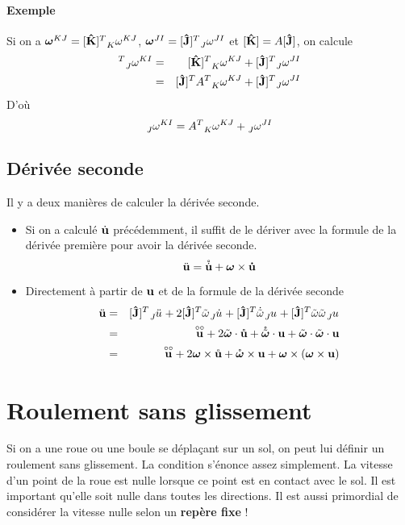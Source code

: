 \paragraph{Exemple}
Si on a $\omegaf^{KJ} = [\uk]^T \wtr{K}{\omega}{KJ}$, $\omegaf^{JI} = [\uj]^T \wtr{J}{\omega}{JI}$ et $[{\bf\hat{K}}] = A[{\bf\hat{J}}]$, on calcule
\begin{eqnarray*}
	[\uj]^T \wtr{J}{\omega}{KI} &=& [\uk]^T \wtr{K}{\omega}{KJ} + [\uj]^T \wtr{J}{\omega}{JI}\\
	&=& [\uj]^T A^T \wtr{K}{\omega}{KJ} + [\uj]^T \wtr{J}{\omega}{JI}
\end{eqnarray*}
D'où
\[ \wtr{J}{\omega}{KI} = A^T \wtr{K}{\omega}{KJ} + \wtr{J}{\omega}{JI} \]

\subsection{Dérivée seconde}
Il y a deux manières de calculer la dérivée seconde.
\begin{itemize}
	\item
		Si on a calculé $\dot{\bf u}$ précédemment, il suffit de le dériver avec la formule de la dérivée première pour avoir la dérivée seconde.
		\[ \ddot{\bf u} = \mathring{\dot{\bf u}} + {\bm \omega} \times \dot{\bf u} \]
	\item
		Directement à partir de ${\bf u}$ et de la formule de la dérivée seconde
		\begin{eqnarray*}
			\fvdd{u} &=&  [\uj]^T \wrt{J}{\ddot{u}} + 2 [\uj]^T \omegat\wrt{J}{\dot{u}} + [\uj]^T \dot{\omegat}\wrt{J}{u} + [\uj]^T \omegat\omegat\wrt{J}{u}\\
			&=& \fvrr{u} + 2 \omegaft \cdot \fvr{u} + \omegaftr \cdot \fv{u} + \omegaft \cdot \omegaft \cdot \fv{u}\\
			&=& \fvrr{u} + 2 \omegaf \times \fvr{u} + \omegafr \times \fv{u} + \omegaf \times (\omegaf \times \fv{u})
		\end{eqnarray*}
\end{itemize}

\section{Roulement sans glissement}

Si on a une roue ou une boule se déplaçant sur un sol, on peut lui définir un roulement sans glissement.
La condition s'énonce assez simplement.
La vitesse d'un point de la roue est nulle lorsque ce point est en contact avec le sol.
Il est important qu'elle soit nulle dans toutes les directions.
Il est aussi primordial de considérer la vitesse nulle selon un {\bf repère fixe} !

